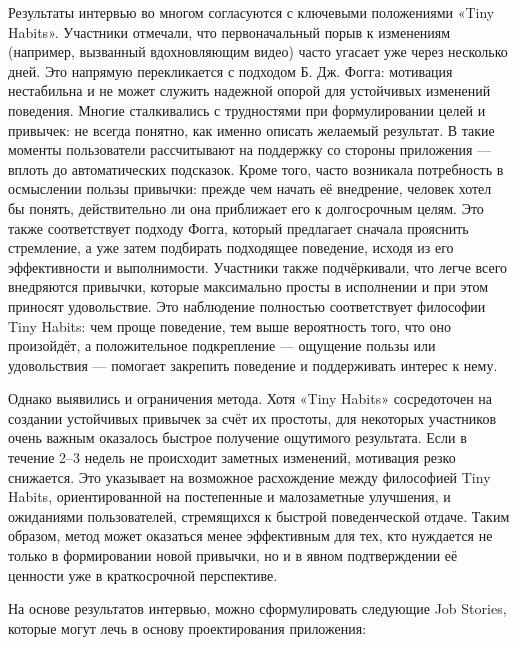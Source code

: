 \documentclass[pdflatex,sn-mathphys-num]{sn-jnl}%
\theoremstyle{thmstyleone}%
\theoremstyle{thmstyletwo}%
\theoremstyle{thmstylethree}%
\begin{document}
Результаты интервью во многом согласуются с ключевыми положениями «Tiny Habits». Участники отмечали, что первоначальный порыв к изменениям (например, вызванный вдохновляющим видео) часто угасает уже через несколько дней. Это напрямую перекликается с подходом Б. Дж. Фогга: мотивация нестабильна и не может служить надежной опорой для устойчивых изменений поведения. Многие сталкивались с трудностями при формулировании целей и привычек: не всегда понятно, как именно описать желаемый результат. В такие моменты пользователи рассчитывают на поддержку со стороны приложения — вплоть до автоматических подсказок. Кроме того, часто возникала потребность в осмыслении пользы привычки: прежде чем начать её внедрение, человек хотел бы понять, действительно ли она приближает его к долгосрочным целям. Это также соответствует подходу Фогга, который предлагает сначала прояснить стремление, а уже затем подбирать подходящее поведение, исходя из его эффективности и выполнимости. Участники также подчёркивали, что легче всего внедряются привычки, которые максимально просты в исполнении и при этом приносят удовольствие. Это наблюдение полностью соответствует философии Tiny Habits: чем проще поведение, тем выше вероятность того, что оно произойдёт, а положительное подкрепление — ощущение пользы или удовольствия — помогает закрепить поведение и поддерживать интерес к нему.

Однако выявились и ограничения метода. Хотя «Tiny Habits» сосредоточен на создании устойчивых привычек за счёт их простоты, для некоторых участников очень важным оказалось быстрое получение ощутимого результата. Если в течение 2–3 недель не происходит заметных изменений, мотивация резко снижается. Это указывает на возможное расхождение между философией Tiny Habits, ориентированной на постепенные и малозаметные улучшения, и ожиданиями пользователей, стремящихся к быстрой поведенческой отдаче. Таким образом, метод может оказаться менее эффективным для тех, кто нуждается не только в формировании новой привычки, но и в явном подтверждении её ценности уже в краткосрочной перспективе.

На основе результатов интервью, можно сформулировать следующие Job Stories, которые могут лечь в основу проектирования приложения:
\end{document}
